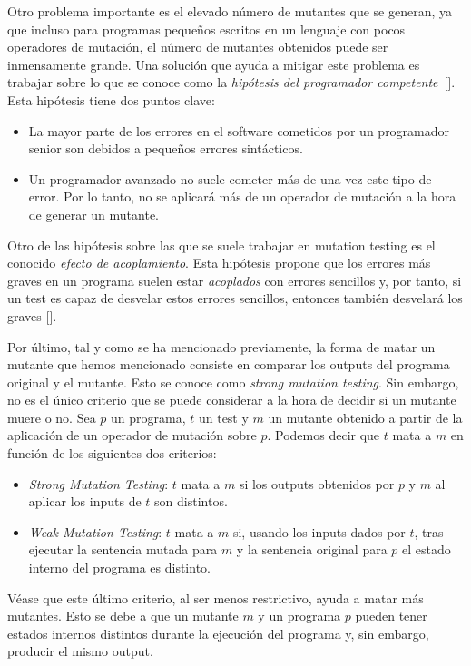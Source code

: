 Otro problema importante es el elevado número de mutantes que se generan, ya que incluso para programas pequeños escritos en un lenguaje con pocos operadores de mutación, el número de mutantes obtenidos puede ser inmensamente grande. Una solución que ayuda a mitigar este problema es trabajar sobre lo que se conoce como la \textit{hipótesis del programador competente}~[\cite{demillo1978hints}]. Esta hipótesis tiene dos puntos clave:
\begin{itemize}
\item La mayor parte de los errores en el software cometidos por un programador senior son debidos a pequeños errores sintácticos.
\item Un programador avanzado no suele cometer más de una vez este tipo de error. Por lo tanto, no se aplicará más de un operador de mutación a la hora de generar un mutante.
\end{itemize}

Otro de las hipótesis sobre las que se suele trabajar en mutation testing es el conocido \textit{efecto de acoplamiento}. Esta hipótesis propone que los errores más graves en un programa suelen estar \textit{acoplados} con errores sencillos y, por tanto, si un test es capaz de desvelar estos errores sencillos, entonces también desvelará los graves [\cite{offutt1992investigations}].

Por último, tal y como se ha mencionado previamente, la forma de matar un mutante que hemos mencionado consiste en  comparar los outputs del programa original y el mutante. Esto se conoce como \textit{strong mutation testing}. Sin embargo, no es el único criterio que se puede considerar a la hora de decidir si un mutante muere o no. Sea $p$ un programa, $t$ un test y $m$ un mutante obtenido a partir de la aplicación de un operador de mutación sobre $p$. Podemos decir que $t$ mata a $m$ en función de los siguientes dos criterios:
%
\begin{itemize}
\item \emph{Strong Mutation Testing}: $t$ mata a $m$ si los outputs obtenidos por $p$ y $m$ al aplicar los inputs de $t$ son distintos.
\item \emph{Weak Mutation Testing}: $t$ mata a $m$ si, usando los inputs dados por $t$,  tras ejecutar la sentencia mutada para $m$ y la sentencia original para $p$ el estado interno del programa es distinto. 
\end{itemize}


Véase que este último criterio, al ser menos restrictivo, ayuda a matar más mutantes. Esto se debe a que un mutante $m$ y un programa $p$ pueden tener estados internos distintos durante la ejecución del programa y, sin embargo, producir el mismo output. 

